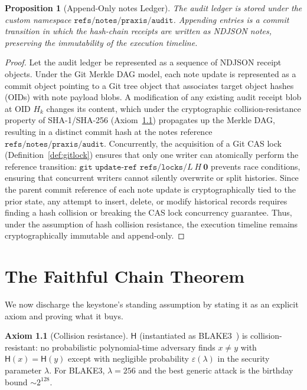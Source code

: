 \documentclass[11pt,oneside]{book}
\theoremstyle{definition}
\newtheorem{axiom}{Axiom}[chapter]
\theoremstyle{plain}
\newtheorem{proposition}[theorem]{Proposition}
\theoremstyle{remark}
\newcommand{\chainH}{\mathsf{H}}               %
\newcommand{\code}[1]{\texttt{#1}}
\begin{document}
\begin{proposition}[Append-Only notes Ledger]\label{prop:notesledger}
The audit ledger is stored under the custom namespace $\code{refs/notes/praxis/audit}$. %
Appending entries is a commit transition in which the hash-chain receipts are written as NDJSON notes, preserving the immutability of the execution timeline. %
\end{proposition}
\begin{proof}
Let the audit ledger be represented as a sequence of NDJSON receipt objects. %
Under the Git Merkle DAG model, each note update is represented as a commit object pointing to a Git tree object that associates target object hashes (OIDs) with note payload blobs. %
A modification of any existing audit receipt blob at OID $H_k$ changes its content, which under the cryptographic collision-resistance property of SHA-1/SHA-256 (Axiom~\ref{ax:cr}) propagates up the Merkle DAG, resulting in a distinct commit hash at the notes reference $\code{refs/notes/praxis/audit}$. %
Concurrently, the acquisition of a Git CAS lock (Definition~\ref{def:gitlock}) ensures that only one writer can atomically perform the reference transition:
$\code{git update-ref refs/locks/}L\ H\ \bm 0$
prevents race conditions, ensuring that concurrent writers cannot silently overwrite or split histories. %
Since the parent commit reference of each note update is cryptographically tied to the prior state, any attempt to insert, delete, or modify historical records requires finding a hash collision or breaking the CAS lock concurrency guarantee. %
Thus, under the assumption of hash collision resistance, the execution timeline remains cryptographically immutable and append-only. %
\end{proof}

\chapter{The Faithful Chain Theorem}
\label{ch:faithful}

We now discharge the keystone's standing assumption by stating it as an explicit axiom and
proving what it buys. %

\begin{axiom}[Collision resistance]\label{ax:cr}
$\chainH$ (instantiated as BLAKE3~\cite{blake3}) is collision-resistant: no probabilistic
polynomial-time adversary finds $x\ne y$ with $\chainH(x)=\chainH(y)$ except with negligible
probability $\varepsilon(\lambda)$ in the security parameter $\lambda$. %
For BLAKE3,
$\lambda=256$ and the best generic attack is the birthday bound $\sim 2^{128}$. %
\end{axiom}
\end{document}
